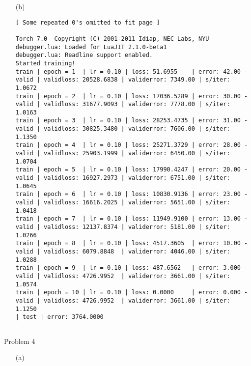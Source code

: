 \documentclass{article}
\begin{document}
\begin{itemize}
\begin{landscape}
\begin{itemize}
\begin{Verbatim}[fontsize=\small]
	\end{Verbatim}
	
	\item[(b)]
	
	\begin{Verbatim}[fontsize=\small]
	[ Some repeated 0's omitted to fit page ]
		
Torch 7.0  Copyright (C) 2001-2011 Idiap, NEC Labs, NYU
debugger.lua: Loaded for LuaJIT 2.1.0-beta1
debugger.lua: Readline support enabled.
Started training!	
train | epoch = 1  | lr = 0.10 | loss: 51.6955    | error: 42.00 - valid | validloss: 20528.6838 | validerror: 7349.00 | s/iter: 1.0672	
train | epoch = 2  | lr = 0.10 | loss: 17036.5289 | error: 30.00 - valid | validloss: 31677.9093 | validerror: 7778.00 | s/iter: 1.0163	
train | epoch = 3  | lr = 0.10 | loss: 28253.4735 | error: 31.00 - valid | validloss: 30825.3480 | validerror: 7606.00 | s/iter: 1.1350	
train | epoch = 4  | lr = 0.10 | loss: 25271.3729 | error: 28.00 - valid | validloss: 25903.1999 | validerror: 6450.00 | s/iter: 1.0704	
train | epoch = 5  | lr = 0.10 | loss: 17990.4247 | error: 20.00 - valid | validloss: 16927.2973 | validerror: 6751.00 | s/iter: 1.0645	
train | epoch = 6  | lr = 0.10 | loss: 10830.9136 | error: 23.00 - valid | validloss: 16616.2025 | validerror: 5651.00 | s/iter: 1.0418	
train | epoch = 7  | lr = 0.10 | loss: 11949.9100 | error: 13.00 - valid | validloss: 12137.8374 | validerror: 5181.00 | s/iter: 1.0266	
train | epoch = 8  | lr = 0.10 | loss: 4517.3605  | error: 10.00 - valid | validloss: 6079.8848  | validerror: 4046.00 | s/iter: 1.0288	
train | epoch = 9  | lr = 0.10 | loss: 487.6562   | error: 3.000 - valid | validloss: 4726.9952  | validerror: 3661.00 | s/iter: 1.0574	
train | epoch = 10 | lr = 0.10 | loss: 0.0000     | error: 0.000 - valid | validloss: 4726.9952  | validerror: 3661.00 | s/iter: 1.1250	
| test | error: 3764.0000


	\end{Verbatim}	
	\end{itemize}
\end{landscape}

\newpage
{}	
\thispagestyle{empty}
\begin{landscape}

\item[Problem 4]

	\begin{itemize}
	
	\item[(a)]


\end{itemize}
\end{landscape}
\end{itemize}
\end{document}

